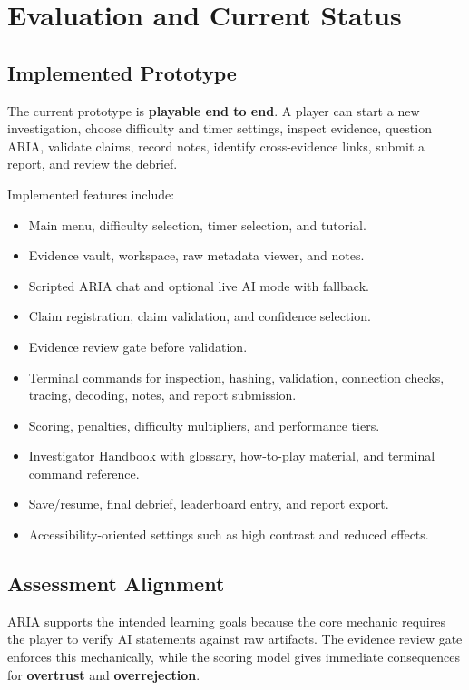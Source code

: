 \chapter{Evaluation and Current Status}

\section{Implemented Prototype}

The current prototype is \textbf{playable end to end}. A player can start a new investigation, choose difficulty and timer settings, inspect evidence, question ARIA, validate claims, record notes, identify cross-evidence links, submit a report, and review the debrief.

Implemented features include:

\begin{itemize}[leftmargin=*]
  \item Main menu, difficulty selection, timer selection, and tutorial.
  \item Evidence vault, workspace, raw metadata viewer, and notes.
  \item Scripted ARIA chat and optional live AI mode with fallback.
  \item Claim registration, claim validation, and confidence selection.
  \item Evidence review gate before validation.
  \item Terminal commands for inspection, hashing, validation, connection checks, tracing, decoding, notes, and report submission.
  \item Scoring, penalties, difficulty multipliers, and performance tiers.
  \item Investigator Handbook with glossary, how-to-play material, and terminal command reference.
  \item Save/resume, final debrief, leaderboard entry, and report export.
  \item Accessibility-oriented settings such as high contrast and reduced effects.
\end{itemize}

\section{Assessment Alignment}

ARIA supports the intended learning goals because the core mechanic requires the player to verify AI statements against raw artifacts. The evidence review gate enforces this mechanically, while the scoring model gives immediate consequences for \textbf{overtrust} and \textbf{overrejection}.

